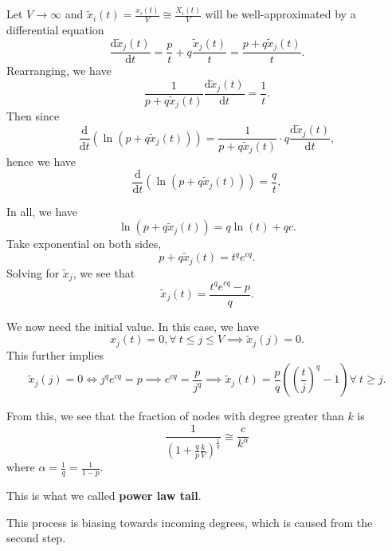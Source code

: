 Let \(V\to \infty \) and \(\widetilde{x}_i(t) = \frac{x_{i}(t)}{V}\cong \frac{X_{i}(t)}{V}\) will be well-approximated by a differential equation
\[
	\frac{\mathrm{d}\widetilde{x}_j(t)}{\mathrm{d}t} = \frac{p}{t} + q \frac{\widetilde{x}_j(t)}{t} = \frac{p + q \widetilde{x}_j(t)}{t}.
\]
Rearranging, we have
\[
	\frac{1}{p+q \widetilde{x}_j(t)}\frac{\mathrm{d}\widetilde{x}_j(t)}{\mathrm{d}t} = \frac{1}{t}.
\]
Then since
\[
	\frac{\mathrm{d}}{\mathrm{d}t}\left(\ln(p + q \widetilde{x}_j(t))\right) = \frac{1}{p + q \widetilde{x}_j(t)}\cdot q \frac{\mathrm{d}\widetilde{x}_j(t)}{\mathrm{d}t},
\]
hence we have
\[
	\frac{\mathrm{d}}{\mathrm{d}t}\left(\ln(p + q \widetilde{x}_j(t))\right) = \frac{q}{t},
\]

In all, we have
\[
	\ln(p + q \widetilde{x}_j(t)) = q \ln(t) + qc.
\]
Take exponential on both sides,
\[
	p + q \widetilde{x}_j(t) = t^q e^{cq}.
\]
Solving for \(\widetilde{x}_j\), we see that
\[
	\widetilde{x}_j(t) = \frac{t^q e^{cq} - p}{q}.
\]

We now need the initial value. In this case, we have
\[
	x_{j}(t) = 0, \forall\ t\leq j\leq V\implies \widetilde{x}_j(j) = 0.
\]
This further implies
\[
	\widetilde{x}_j(j) = 0 \iff j^q e^{cq} = p \implies e^{cq} = \frac{p}{j^q} \implies \widetilde{x}_j(t) = \frac{p}{q}\left(\left(\frac{t}{j}\right)^q - 1\right)\forall\ t\geq j.
\]

From this, we see that the fraction of nodes with degree greater than \(k\) is
\[
	\frac{1}{\left(1 + \frac{q}{p}\frac{k}{V}\right)^{\frac{1}{q}}} \cong \frac{c}{k^{\alpha}}
\]
where \(\alpha = \frac{1}{q} = \frac{1}{1 - p}\).

\begin{note}
	This is what we called \textbf{power law tail}.
\end{note}

\begin{remark}
	This process is biasing towards incoming degrees, which is caused from the second step.
\end{remark}

